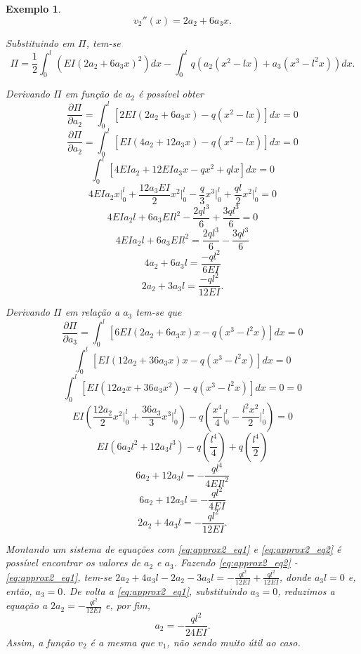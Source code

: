 \documentclass[
	12pt,				%
	openright,			%
    twoside,			%
	a4paper,			%
	english,			%
	french,				%
	spanish,			%
	brazil				%
	]{abntex2}
\theoremstyle{plain}
\newtheorem{example}{Exemplo}
\begin{document}
\begin{example}
	$$
	v_2''(x)=
	2a_2 + 6a_3 x \text{.}
	$$
	
	Substituindo em $\Pi$, tem-se
	$$
		\Pi=
		\frac{1}{2}
		\int_0^l
			\left (
				EI(2a_2+6a_3x)^2
			\right ) dx
		-
		\int_0^l
			q
			\left (
				a_2(x^2-lx)
				+
				a_3(x^3-l^2x)
			\right ) dx
		\text{.}
	$$
	
	Derivando $\Pi$ em função de $a_2$ é possível obter
	$$
		\frac{\partial \Pi}{\partial a_2}
		=
		\int_0^l \left [
			2EI(2a_2+6a_3x)-q(x^2-lx)
		\right ] dx
		= 0
	$$	
	$$
		\frac{\partial \Pi}{\partial a_2}
		=
		\int_0^l \left [
			EI(4a_2+12a_3x)-q(x^2-lx)
		\right ] dx
		= 0
	$$
	$$
		\int_0^l \left [
			4EIa_2 + 12EIa_3x - qx^2 + qlx
		\right ] dx
		= 0
	$$
	$$
		4EIa_2 x \Big |_0^l
		+
		\frac{12a_3EI}{2} x^2 \Big |_0^l
		-
		\frac{q}{3} x^3 \Big |_0^l
		+
		\frac{ql}{2} x^2 \Big |_0^l
		= 0
	$$
	$$
		4EIa_2l
		+
		6a_3EIl^2
		-
		\frac{2ql^3}{6}
		+
		\frac{3ql^3}{6}
		= 0
	$$
	$$
		4EIa_2l
		+
		6a_3EIl^2
		=
		\frac{2ql^3}{6}
		-
		\frac{3ql^3}{6}
	$$
	$$
		4a_2 + 6a_3l
		=
		\frac{-ql^2}{6EI}
	$$
	\begin{equation}
		\label{eq:approx2_eq1}
		2a_2 + 3a_3l
		=
		\frac{-ql^2}{12EI}
		\text{.}
	\end{equation}
	
	Derivando $\Pi$ em relação a $a_3$ tem-se que
	$$
		\frac{\partial \Pi}{\partial a_3}
		=
		\int_0^l \left [
			6EI(2a_2 + 6a_3x)x
			-
			q(x^3 - l^2x)
		\right ] dx
		= 0
	$$
	$$
		\int_0^l \left [
			EI(12a_2 + 36a_3x)x
			-
			q(x^3 - l^2x)
		\right ] dx
		= 0
	$$
	$$
		\int_0^l \left [
			EI(12a_2 x + 36a_3x^2)
			-
			q(x^3 - l^2x)
		\right ] dx = 0
		= 0
	$$
	$$
		EI \left (
			\frac{12a_2}{2}x^2 \Big |_0^l
			+
			\frac{36a_3}{3}x^3 \Big |_0^l
		\right )
		-
		q \left (
			\frac{x^4}{4} \Big |_0^l
			-
			\frac{l^2x^2}{2} \Big |_0^l
		\right )
		= 0
	$$
	$$
		EI(6a_2l^2 + 12a_3l^3)
		-
		q \left (
			\frac{l^4}{4}
		\right )
		+
		q \left (
			\frac{l^4}{2}
		\right )
	$$
	$$
		6a_2 + 12a_3l = -\frac{ql^4}{4EIl^2}
	$$
	$$
		6a_2 + 12a_3l = -\frac{ql^2}{4EI}
	$$
	\begin{equation}
		\label{eq:approx2_eq2}
		2a_2 + 4a_3l = -\frac{ql^2}{12EI}
		\text{.}
	\end{equation}
	
	Montando um sistema de equações com \eqref{eq:approx2_eq1} e \eqref{eq:approx2_eq2} é possível encontrar os valores de $a_2$ e $a_3$. Fazendo \eqref{eq:approx2_eq2} - \eqref{eq:approx2_eq1}, tem-se $2a_2+4a_3l-2a_2-3a_3l=-\frac{ql^2}{12EI}+\frac{ql^2}{12EI}$, donde $a_3l=0$ e, então, $a_3=0$.
	De volta a \eqref{eq:approx2_eq1}, substituindo $a_3=0$, reduzimos a equação a $2a_2=-\frac{ql^2}{12EI}$ e, por fim,
	$$
		a_2=-\frac{ql^2}{24EI}
		\text{.}
	$$
	Assim, a função $v_2$ é a mesma que $v_1$, não sendo muito útil ao caso.
	

\end{example}
\end{document}
